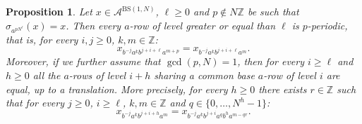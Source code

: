 \documentclass[letterpaper,10pt]{article}
\theoremstyle{plain}
\newtheorem{proposition}[theorem]{Proposition}
\newcommand{\BS}[1][N]{\mathrm{BS}(1,#1)}
\begin{document}
	\begin{proposition}\label{prop.bs_periodicity_p_generalcase}
		Let $x\in \mathcal{A}^{\BS}$, $\ell\ge 0$ and $p\notin N\mathbb{Z}$ be such that $\sigma_{a^{pN^\ell}}(x)=x$. Then every $a$-row of level greater or equal than $\ell$ is $p$-periodic, that is, for every $i,j\ge 0$, $k,m\in \mathbb{Z}$:
		$$
		x_{b^{-j}a^kb^{j+i+\ell}a^{m+p}}=x_{b^{-j}a^kb^{j+i+\ell}a^{m}}.
		$$
		Moreover, if we further assume that $\gcd(p,N)=1$, then for every $i\ge \ell$ and $h\ge 0$ all the $a$-rows of level $i+h$ sharing a common base $a$-row of level $i$ are equal, up to a translation. More precisely, for every $h\ge 0$ there exists $r\in \mathbb{Z}$ such that for every $j\ge 0$, $i\ge \ell$, $k,m\in \mathbb{Z}$ and $q\in \{0,\ldots,N^h-1\}$:
		$$
		x_{b^{-j}a^{k}b^{j+i+h}a^{m}}=x_{b^{-j}a^{k}b^{j+i}a^{q}b^{h}a^{m-qr}}.
		$$
		
	\end{proposition}
\end{document}
